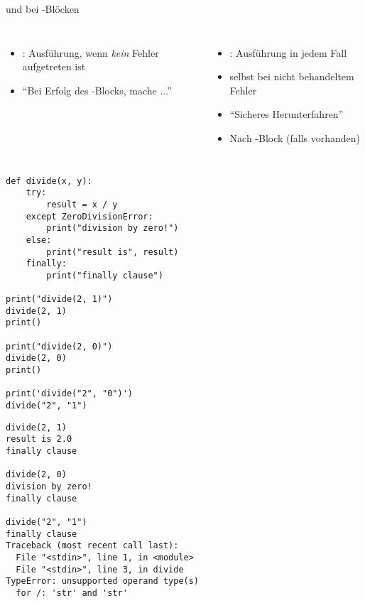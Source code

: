 
\begin{frame}[fragile]{ und  bei -Blöcken}
%
\begin{columns}[T]
\begin{itemize}
\item {}: Ausführung, wenn \emph{kein} Fehler aufgetreten ist
\item \enquote{Bei Erfolg des -Blocks, mache ...}
\end{itemize}
%
\begin{itemize}
\item {}: Ausführung in jedem Fall
\item selbst bei nicht behandeltem Fehler
\item \enquote{Sicheres Herunterfahren}
\item Nach -Block (falls vorhanden)
\end{itemize}
\end{columns}
%
\end{frame}


\begin{frame}[fragile]
%
\begin{tcbraster}[raster columns=2,
                  raster equal height,
                  nobeforeafter,
                  raster column skip=0.5cm]
\begin{codebox}
\begin{verbatim}
def divide(x, y):
    try:
        result = x / y
    except ZeroDivisionError:
        print("division by zero!")
    else:
        print("result is", result)
    finally:
        print("finally clause")

print("divide(2, 1)")
divide(2, 1)
print()

print("divide(2, 0)")
divide(2, 0)
print()

print('divide("2", "0")')
divide("2", "1")
\end{verbatim}
\end{codebox}
%
\begin{cmdbox}
\begin{verbatim}
divide(2, 1)
result is 2.0
finally clause

divide(2, 0)
division by zero!
finally clause

divide("2", "1")
finally clause
Traceback (most recent call last):
  File "<stdin>", line 1, in <module>
  File "<stdin>", line 3, in divide
TypeError: unsupported operand type(s) 
  for /: 'str' and 'str'
\end{verbatim}
\end{cmdbox}
\end{tcbraster}
%
\end{frame}

